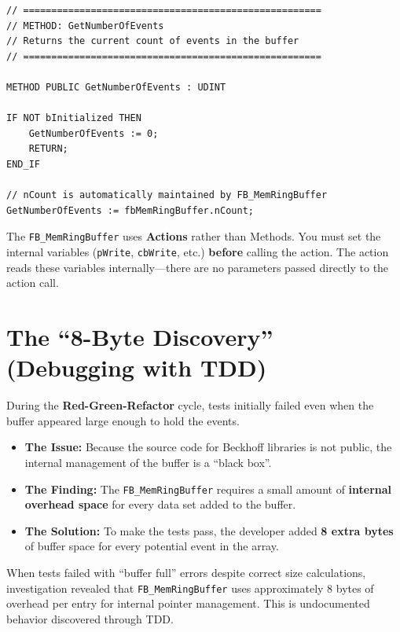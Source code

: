 \documentclass[11pt,a4paper]{article}
\begin{document}
\begin{lstlisting}
// =====================================================
// METHOD: GetNumberOfEvents
// Returns the current count of events in the buffer
// =====================================================

METHOD PUBLIC GetNumberOfEvents : UDINT

IF NOT bInitialized THEN
    GetNumberOfEvents := 0;
    RETURN;
END_IF

// nCount is automatically maintained by FB_MemRingBuffer
GetNumberOfEvents := fbMemRingBuffer.nCount;
\end{lstlisting}

\begin{warningbox}
The \texttt{FB\_MemRingBuffer} uses \textbf{Actions} rather than Methods. You must set the internal variables (\texttt{pWrite}, \texttt{cbWrite}, etc.) \textbf{before} calling the action. The action reads these variables internally---there are no parameters passed directly to the action call.
\end{warningbox}

\section{The ``8-Byte Discovery'' (Debugging with TDD)}

During the \textbf{Red-Green-Refactor} cycle, tests initially failed even when the buffer appeared large enough to hold the events.

\begin{itemize}[leftmargin=*]
    \item \textbf{The Issue:} Because the source code for Beckhoff libraries is not public, the internal management of the buffer is a ``black box''.
    \item \textbf{The Finding:} The \texttt{FB\_MemRingBuffer} requires a small amount of \textbf{internal overhead space} for every data set added to the buffer.
    \item \textbf{The Solution:} To make the tests pass, the developer added \textbf{8 extra bytes} of buffer space for every potential event in the array.
\end{itemize}

\begin{debugbox}
When tests failed with ``buffer full'' errors despite correct size calculations, investigation revealed that \texttt{FB\_MemRingBuffer} uses approximately 8 bytes of overhead per entry for internal pointer management. This is undocumented behavior discovered through TDD.
\end{debugbox}
\end{document}
